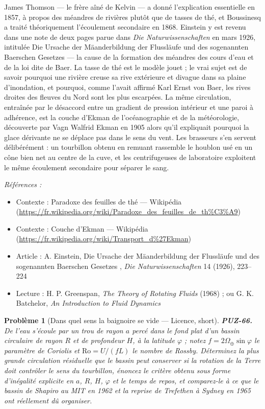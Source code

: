 \documentclass[11pt]{article}
\newtheorem{problem}{Problème}
\newenvironment{refs}{\par\small\noindent\emph{Références :}\begin{itemize}\setlength\itemsep{0pt}}{\end{itemize}\normalsize}
\begin{document}
\noindent James Thomson --- le frère aîné de Kelvin --- a donné l'explication
essentielle en 1857, à propos des méandres de rivières plutôt que de tasses de thé, et
Boussinesq a traité théoriquement l'écoulement secondaire en 1868. Einstein y est revenu dans
une note de deux pages parue dans \textit{Die Naturwissenschaften} en mars 1926, intitulée
\og{} Die Ursache der Mäanderbildung der Flussläufe und des sogenannten Baerschen Gesetzes \fg{} --- la
cause de la formation des méandres des cours d'eau et de la loi dite de Baer. La tasse de thé
est le modèle jouet ; le vrai sujet est de savoir pourquoi une rivière creuse sa rive
extérieure et divague dans sa plaine d'inondation, et pourquoi, comme l'avait affirmé Karl
Ernst von Baer, les rives droites des fleuves du Nord sont les plus escarpées. La même
circulation, entraînée par le désaccord entre un gradient de pression intérieur et une paroi
à adhérence, est la couche d'Ekman de l'océanographie et de la météorologie, découverte par
Vagn Walfrid Ekman en 1905 alors qu'il expliquait pourquoi la glace dérivante ne se déplace
pas dans le sens du vent. Les brasseurs s'en servent délibérément : un \og{} tourbillon \fg{} obtenu
en remuant rassemble le houblon usé en un cône bien net au centre de la cuve, et les
centrifugeuses de laboratoire exploitent le même écoulement secondaire pour séparer le
sang.

\begin{refs}
\item Contexte : Paradoxe des feuilles de thé --- Wikipédia (\url{https://fr.wikipedia.org/wiki/Paradoxe_des_feuilles_de_th%C3%A9})
\item Contexte : Couche d'Ekman --- Wikipédia (\url{https://fr.wikipedia.org/wiki/Transport_d%27Ekman})
\item Article : A. Einstein, \og{} Die Ursache der Mäanderbildung der Flussläufe und des sogenannten Baerschen Gesetzes \fg{}, \textit{Die Naturwissenschaften} 14 (1926), 223--224
\item Lecture : H. P. Greenspan, \textit{The Theory of Rotating Fluids} (1968) ; ou G. K. Batchelor, \textit{An Introduction to Fluid Dynamics}
\end{refs}

\bigskip

\begin{problem}[{Dans quel sens la baignoire se vide --- Licence, short}]
\textbf{PUZ-66.} De l'eau s'écoule par un trou de rayon $ a $ percé
dans le fond plat d'un bassin circulaire de rayon $ R $ et de profondeur $ H $, à la
latitude $ \varphi $ ; notez $ f = 2\Omega_\oplus \sin\varphi $ le paramètre de Coriolis
et $ \mathrm{Ro} = U/(fL) $ le nombre de Rossby. Déterminez la plus grande circulation
résiduelle que le bassin peut conserver si la rotation de la Terre doit contrôler le sens du
tourbillon, énoncez le critère obtenu sous forme d'inégalité explicite en $ a $, $ R $,
$ H $, $ \varphi $ et le temps de repos, et comparez-le à ce que le bassin de Shapiro au
MIT en 1962 et la reprise de Trefethen à Sydney en 1965 ont réellement dû organiser.
\end{problem}
\end{document}
